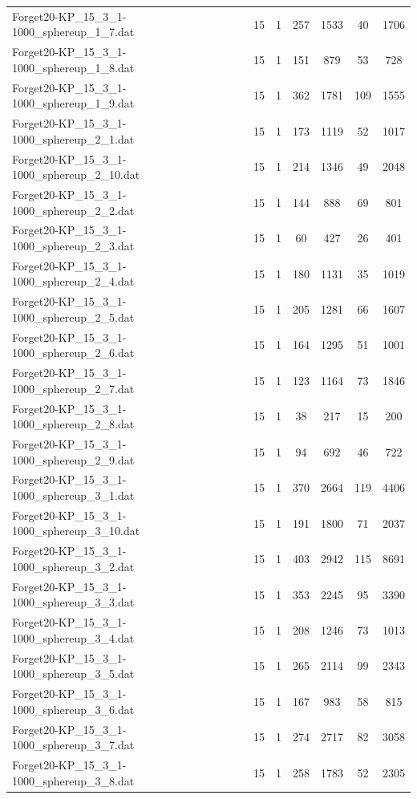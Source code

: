 \begin{table}[!ht]
\begin{tabular}{lcccccc}
Forget20-KP\_15\_3\_1-1000\_sphereup\_1\_7.dat & 15 & 1 & 257 & 1533 & 40 & 1706 \\
Forget20-KP\_15\_3\_1-1000\_sphereup\_1\_8.dat & 15 & 1 & 151 & 879 & 53 & 728 \\
Forget20-KP\_15\_3\_1-1000\_sphereup\_1\_9.dat & 15 & 1 & 362 & 1781 & 109 & 1555 \\
Forget20-KP\_15\_3\_1-1000\_sphereup\_2\_1.dat & 15 & 1 & 173 & 1119 & 52 & 1017 \\
Forget20-KP\_15\_3\_1-1000\_sphereup\_2\_10.dat & 15 & 1 & 214 & 1346 & 49 & 2048 \\
Forget20-KP\_15\_3\_1-1000\_sphereup\_2\_2.dat & 15 & 1 & 144 & 888 & 69 & 801 \\
Forget20-KP\_15\_3\_1-1000\_sphereup\_2\_3.dat & 15 & 1 & 60 & 427 & 26 & 401 \\
Forget20-KP\_15\_3\_1-1000\_sphereup\_2\_4.dat & 15 & 1 & 180 & 1131 & 35 & 1019 \\
Forget20-KP\_15\_3\_1-1000\_sphereup\_2\_5.dat & 15 & 1 & 205 & 1281 & 66 & 1607 \\
Forget20-KP\_15\_3\_1-1000\_sphereup\_2\_6.dat & 15 & 1 & 164 & 1295 & 51 & 1001 \\
Forget20-KP\_15\_3\_1-1000\_sphereup\_2\_7.dat & 15 & 1 & 123 & 1164 & 73 & 1846 \\
Forget20-KP\_15\_3\_1-1000\_sphereup\_2\_8.dat & 15 & 1 & 38 & 217 & 15 & 200 \\
Forget20-KP\_15\_3\_1-1000\_sphereup\_2\_9.dat & 15 & 1 & 94 & 692 & 46 & 722 \\
Forget20-KP\_15\_3\_1-1000\_sphereup\_3\_1.dat & 15 & 1 & 370 & 2664 & 119 & 4406 \\
Forget20-KP\_15\_3\_1-1000\_sphereup\_3\_10.dat & 15 & 1 & 191 & 1800 & 71 & 2037 \\
Forget20-KP\_15\_3\_1-1000\_sphereup\_3\_2.dat & 15 & 1 & 403 & 2942 & 115 & 8691 \\
Forget20-KP\_15\_3\_1-1000\_sphereup\_3\_3.dat & 15 & 1 & 353 & 2245 & 95 & 3390 \\
Forget20-KP\_15\_3\_1-1000\_sphereup\_3\_4.dat & 15 & 1 & 208 & 1246 & 73 & 1013 \\
Forget20-KP\_15\_3\_1-1000\_sphereup\_3\_5.dat & 15 & 1 & 265 & 2114 & 99 & 2343 \\
Forget20-KP\_15\_3\_1-1000\_sphereup\_3\_6.dat & 15 & 1 & 167 & 983 & 58 & 815 \\
Forget20-KP\_15\_3\_1-1000\_sphereup\_3\_7.dat & 15 & 1 & 274 & 2717 & 82 & 3058 \\
Forget20-KP\_15\_3\_1-1000\_sphereup\_3\_8.dat & 15 & 1 & 258 & 1783 & 52 & 2305 \\

\end{tabular}
\end{table}
